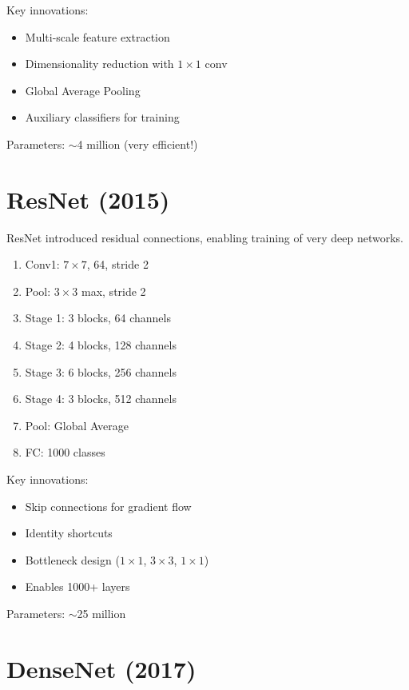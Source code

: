 Key innovations:
\begin{itemize}
    \item Multi-scale feature extraction
    \item Dimensionality reduction with $1\times1$ conv
    \item Global Average Pooling
    \item Auxiliary classifiers for training
\end{itemize}

Parameters: $\sim$4 million (very efficient!)

\section{ResNet (2015)}

ResNet introduced residual connections, enabling training of very deep networks.

\begin{architecture}
\begin{enumerate}
    \item Conv1: $7\times7$, 64, stride 2
    \item Pool: $3\times3$ max, stride 2
    \item Stage 1: 3 blocks, 64 channels
    \item Stage 2: 4 blocks, 128 channels
    \item Stage 3: 6 blocks, 256 channels
    \item Stage 4: 3 blocks, 512 channels
    \item Pool: Global Average
    \item FC: 1000 classes
\end{enumerate}
\end{architecture}

Key innovations:
\begin{itemize}
    \item Skip connections for gradient flow
    \item Identity shortcuts
    \item Bottleneck design ($1\times1$, $3\times3$, $1\times1$)
    \item Enables 1000+ layers
\end{itemize}

Parameters: $\sim$25 million

\section{DenseNet (2017)}


